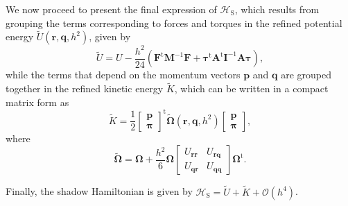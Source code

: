 \documentclass[
	aip,
	jcp,
	reprint,
]{revtex4-1}
\newcommand{\mt}[1]{\boldsymbol{\mathbf{#1}}}          %
\newcommand{\vt}[1]{\boldsymbol{\mathbf{#1}}}          %
\newcommand{\tr}[1]{#1^\text{t}}                       %
\newcommand{\Ham}[1]{{\mathcal H}_\text{#1}}           %
\newcommand{\timestep}{h}
\newcommand{\refined}[1]{\widetilde{#1}}
\begin{document}
We now proceed to present the final expression of $\Ham{S}$, which results from grouping the terms corresponding to forces and torques in the refined potential energy $\refined U(\vt r, \vt q, h^2)$, given by
\begin{equation*}
\refined U = U - \frac{\timestep^2}{24} \left( \tr{\vt F} {\mt M}^{-1} {\vt F} + \tr{\vt \tau} \tr{\mt A} {\mt I}^{-1} {\mt A} {\vt \tau} \right),
\end{equation*}
while the terms that depend on the momentum vectors $\vt p$ and $\vt q$ are grouped together in the refined kinetic energy $\refined K$, which can be written in a compact matrix form as
\begin{equation*}
\refined K = \frac{1}{2} \tr{ \left[\begin{array}{c} \vt p \\ \vt \pi \end{array}\right]} \refined{\mathbf \Omega}(\vt r, \vt q, h^2) \left[\begin{array}{c} \vt p \\ \vt \pi \end{array}\right],
\end{equation*}
where
\begin{equation*}
\refined{\mt \Omega} = {\mt \Omega} + \frac{\timestep^2}{6} {\mt \Omega} \left[\begin{array}{cc}
U_{\vt r \vt r} & U_{\vt r \vt q} \\
U_{\vt q \vt r} & U_{\vt q \vt q}
\end{array}\right] \tr{\mt \Omega}.
\end{equation*}

Finally, the shadow Hamiltonian is given by $\Ham{S} = {\refined U} + {\refined K} + {\mathcal O}(\timestep^4)$.


\end{document}
